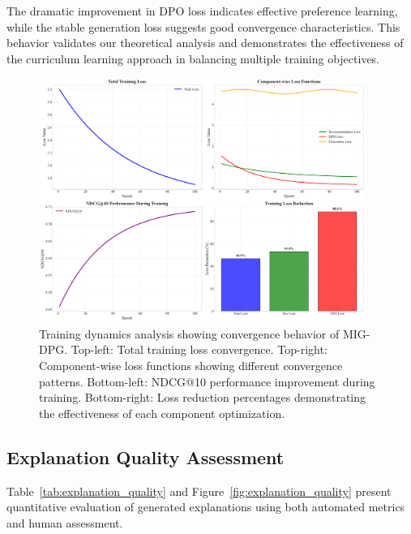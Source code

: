 \documentclass[pdflatex,sn-mathphys-num]{sn-jnl}%
\theoremstyle{thmstyleone}%
\theoremstyle{thmstyletwo}%
\theoremstyle{thmstylethree}%
\begin{document}
The dramatic improvement in DPO loss indicates effective preference learning, while the stable generation loss suggests good convergence characteristics. This behavior validates our theoretical analysis and demonstrates the effectiveness of the curriculum learning approach in balancing multiple training objectives.

\begin{figure}[t]
\centering
\includegraphics[width=0.95\textwidth]{figures/training_dynamics.pdf}
\caption{Training dynamics analysis showing convergence behavior of MIG-DPG. Top-left: Total training loss convergence. Top-right: Component-wise loss functions showing different convergence patterns. Bottom-left: NDCG@10 performance improvement during training. Bottom-right: Loss reduction percentages demonstrating the effectiveness of each component optimization.}
\label{fig:training_dynamics}
\end{figure}

\subsection{Explanation Quality Assessment}

Table~\ref{tab:explanation_quality} and Figure~\ref{fig:explanation_quality} present quantitative evaluation of generated explanations using both automated metrics and human assessment.
\end{document}
